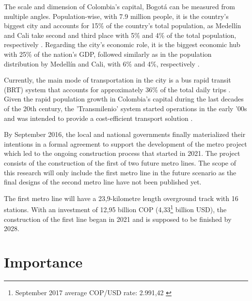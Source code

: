 \documentclass[12pt, a4paper]{report}
\begin{document}
The scale and dimension of Colombia's capital, Bogot\'{a} can be measured from multiple angles. Population-wise, with 7.9 million people, it is the country's biggest city and accounts for 15\% of the country's total population, as Medell\'{i}n and Cali take second and third place with 5\% and 4\% of the total population, respectively \citep{daneProyeccionesPoblacionPopulation2023}. Regarding the city's economic role, it is the biggest economic hub with 25\% of the nation's GDP, followed similarly as in the population distribution by Medell\'{i}n and Cali, with 6\% and 4\%, respectively \citep{daneCuentasNacionalesDepartamentales2023}.

Currently, the main mode of transportation in the city is a bus rapid transit (BRT) system that accounts for approximately 36\% of the total daily trips \citep{alcaldiadebogotad.c.EncuestaMovilidad20192019}. Given the rapid population growth in Colombia's capital during the last decades of the 20th century, the 'Transmilenio' system started operations in the early '00s and was intended to provide a cost-efficient transport solution \citep{rodriguezValueAccessibilityBogota2004}. 

By September 2016, the local and national governments finally materialized their intentions in a formal agreement to support the development of the metro project which led to the ongoing construction process that started in 2021. The project consists of the construction of the first of two future metro lines. The scope of this research will only include the first metro line in the future scenario as the final designs of the second metro line have not been published yet. 

The first metro line will have a 23,9-kilometre length overground track with 16 stations. With an investment of 12,95 billion COP (4,33\footnote{September 2017 average COP/USD rate: 2.991,42 \citep{bancodelarepublicaTasaCambioRepresentativa2023}} billion USD), the construction of the first line began in 2021 and is supposed to be finished by 2028.



\section{Importance}
\end{document}
